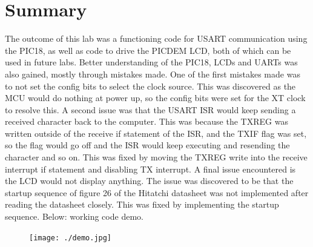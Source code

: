 \documentclass[12pt]{article}
\begin{document}
\section{Summary}
The outcome of this lab was a functioning code for USART communication using the PIC18, as well as code to drive the PICDEM LCD, both of which can be used in future labs. Better understanding of the PIC18, LCDs and UARTs was also gained, mostly through mistakes made. One of the first mistakes made was to not set the config bits to select the clock source. This was discovered as the MCU would do nothing at power up, so the config bits were set for the XT clock to resolve this. A second issue was that the USART ISR would keep sending a received character back to the computer. This was because the TXREG was written outside of the receive if statement of the ISR, and the TXIF flag was set, so the flag would go off and the ISR would keep executing and resending the character and so on. This was fixed by moving the TXREG write into the receive interrupt if statement and disabling TX interrupt. A final issue encountered is the LCD would not display anything. The issue was discovered to be that the startup sequence of figure 26 of the Hitatchi datasheet was not implemented after reading the datasheet closely. This was fixed by implementing the startup sequence. Below: working code demo.
\FloatBarrier
\begin{figure}[h!]
\begin{center}
 \texttt{[image: ./demo.jpg]}
\end{center}
\end{figure}
\FloatBarrier
\end{document}
